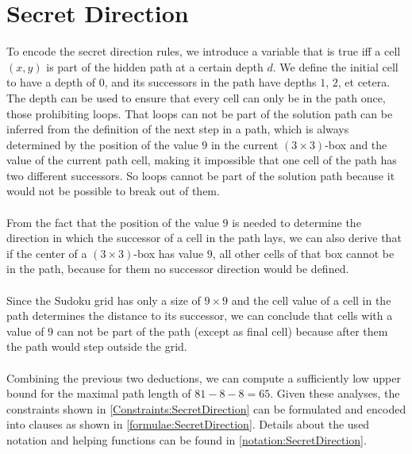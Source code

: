 \section{Secret Direction}
To encode the secret direction rules, we introduce a variable that is true iff a cell $(x,y)$ is part of the hidden path at a certain depth $d$. We define the initial cell to have a depth of $0$, and its successors in the path have depths $1$, $2$, et cetera. The depth can be used to ensure that every cell can only be in the path once, those prohibiting loops. That loops can not be part of the solution path can be inferred from the definition of the next step in a path, which is always determined by the position of the value $9$ in the current $(3\times3)$-box and the value of the current path cell, making it impossible that one cell of the path has two different successors. So loops cannot be part of the solution path because it would not be possible to break out of them.\\
\\
From the fact that the position of the value $9$ is needed to determine the direction in which the successor of a cell in the path lays, we can also derive that if the center of a $(3\times3)$-box has value $9$, all other cells of that box cannot be in the path, because for them no successor direction would be defined.\\
\\
Since the Sudoku grid has only a size of $9\times9$ and the cell value of a cell in the path determines the distance to its successor, we can conclude that cells with a value of $9$ can not be part of the path (except as final cell) because after them the path would step outside the grid.\\
\\
Combining the previous two deductions, we can compute a sufficiently low upper bound for the maximal path length of $81-8-8 = 65$. Given these analyses, the constraints shown in \ref{Constraints:SecretDirection} can be formulated and encoded into clauses as shown in \ref{formulae:SecretDirection}. Details about the used notation and helping functions can be found in \ref{notation:SecretDirection}.



